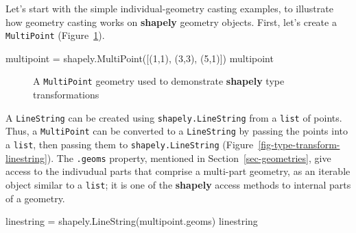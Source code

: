 \documentclass[
  letterpaper,
]{krantz}
\newenvironment{Shaded}{\begin{snugshade}}{\end{snugshade}}
\newcommand{\DecValTok}[1]{\textcolor[rgb]{0.68,0.00,0.00}{#1}}
\newcommand{\NormalTok}[1]{\textcolor[rgb]{0.00,0.23,0.31}{#1}}
\newcommand{\OperatorTok}[1]{\textcolor[rgb]{0.37,0.37,0.37}{#1}}
\begin{document}
Let's start with the simple individual-geometry casting examples, to
illustrate how geometry casting works on \textbf{shapely} geometry
objects. First, let's create a
\texttt{\textquotesingle{}MultiPoint\textquotesingle{}}
(Figure~\ref{fig-type-transform-multipoint}).

\begin{Shaded}
\begin{Highlighting}[]
\NormalTok{multipoint }\OperatorTok{=}\NormalTok{ shapely.MultiPoint([(}\DecValTok{1}\NormalTok{,}\DecValTok{1}\NormalTok{), (}\DecValTok{3}\NormalTok{,}\DecValTok{3}\NormalTok{), (}\DecValTok{5}\NormalTok{,}\DecValTok{1}\NormalTok{)])}
\NormalTok{multipoint}
\end{Highlighting}
\end{Shaded}

\begin{figure}[H]


\caption{\label{fig-type-transform-multipoint}A
\texttt{\textquotesingle{}MultiPoint\textquotesingle{}} geometry used to
demonstrate \textbf{shapely} type transformations}

\end{figure}%

A \texttt{\textquotesingle{}LineString\textquotesingle{}} can be created
using \texttt{shapely.LineString} from a \texttt{list} of points. Thus,
a \texttt{\textquotesingle{}MultiPoint\textquotesingle{}} can be
converted to a \texttt{\textquotesingle{}LineString\textquotesingle{}}
by passing the points into a \texttt{list}, then passing them to
\texttt{shapely.LineString}
(Figure~\ref{fig-type-transform-linestring}). The \texttt{.geoms}
property, mentioned in Section~\ref{sec-geometries}, give access to the
indivudual parts that comprise a multi-part geometry, as an iterable
object similar to a \texttt{list}; it is one of the \textbf{shapely}
access methods to internal parts of a geometry.

\begin{Shaded}
\begin{Highlighting}[]
\NormalTok{linestring }\OperatorTok{=}\NormalTok{ shapely.LineString(multipoint.geoms)}
\NormalTok{linestring}
\end{Highlighting}
\end{Shaded}
\end{document}
